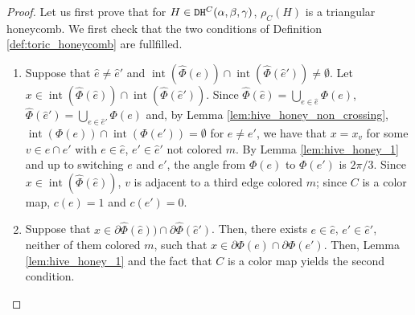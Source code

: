 \documentclass[11pt,a4paper]{amsart}
\providecommand{\dualhive}{\texttt{\textsc{DH}}}
\DeclareMathOperator{\interior}{int}
\numberwithin{equation}{section}
\theoremstyle{definition}
\begin{document}
\begin{proof}
Let us first prove that for $H \in \dualhive^C(\alpha,\beta,\gamma)$, 
$\rho_{C}(H)$ is a triangular honeycomb. 
We first check that the two conditions of Definition \ref{def:toric_honeycomb} 
are fullfilled.
\begin{enumerate}
\item Suppose that $\hat{e}\not=\hat{e}'$ and 
$\interior(\hat{\Phi}(\hat{e}))\cap \interior(\hat{\Phi}(\hat{e}'))\not=\emptyset$. 
Let $x\in \interior(\hat{\Phi}(\hat{e}))\cap \interior(\hat{\Phi}(\hat{e}'))$. 
Since $\hat{\Phi}(\hat{e})=\bigcup_{e\in\hat{e}}\Phi(e)$, 
$\hat{\Phi}(\hat{e}')=\bigcup_{e\in\hat{e}'}\Phi(e)$ and, 
by Lemma \ref{lem:hive_honey_non_crossing}, 
$\interior(\Phi(e))\cap \interior(\Phi(e'))=\emptyset$ for $e\not=e'$, we have that $x=x_v$ 
for some $v\in  e\cap e'$ with $e\in \hat{e}$, $e'\in \hat{e}'$ not colored $m$. 
By Lemma \ref{lem:hive_honey_1} and up to switching $e$ and $e'$, 
the angle from $\Phi(e)$ to $\Phi(e')$ is $2\pi/3$. 
Since $x\in \interior(\hat{\Phi}(\hat{e}))$, $v$ is adjacent to a third edge colored 
$m$; since $C$ is a color map, $c(e)=1$ and $c(e')=0$.  
\item Suppose that $x\in \partial \hat{\Phi}(\hat{e}))\cap \partial\hat{\Phi}(\hat{e}')$. 
Then, there exists $e\in\hat{e}$, $e'\in\hat{e}'$, neither of them colored $m$, 
such that $x\in \partial \Phi(e)\cap \partial\Phi(e')$. 
Then, Lemma \ref{lem:hive_honey_1} and the fact that $C$ is a color map yields 
the second condition.
\end{enumerate}


\end{proof}
\end{document}
